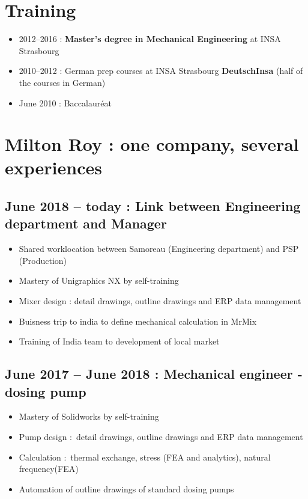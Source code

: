 \documentclass[10pt,a4paper,sans]{article}
\begin{document}
\begin{minipage}[t]{0.68\textwidth}
    \vspace{0.15cm}
    \section{Training}
        \begin{itemize}
            \item{2012--2016 : \textbf{Master's degree in Mechanical Engineering} at INSA Strasbourg}
            \item{2010--2012 : German prep courses at INSA Strasbourg \textbf{DeutschInsa} \newline (half of the courses in German)}
            \item{June 2010 : Baccalauréat }
        \end{itemize}

    \section{Milton Roy : one company, several experiences}
    \subsection{June 2018 -- today : Link between Engineering department and Manager}
    \begin{itemize}%
        \item{Shared worklocation between Samoreau (Engineering department) and PSP (Production)}
        \item{Mastery of Unigraphics NX by self-training}
        \item{Mixer design : detail drawings, outline drawings and ERP data management}
        \item{Buisness trip to india to define mechanical calculation in MrMix} 
        \item{Training of India team to development of local market}
    \end{itemize}

    \subsection{June 2017 -- June 2018 : Mechanical engineer - dosing pump}
    \begin{itemize}
        \item{Mastery of Solidworks by self-training}
        \item{Pump design : detail drawings, outline drawings and ERP data management}
        \item{Calculation : thermal exchange, stress (FEA and analytics), natural frequency(FEA)}
        \item{Automation of outline drawings of standard dosing pumps}
    \end{itemize}


\end{minipage}
\end{document}
